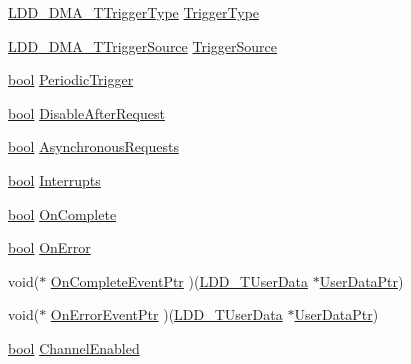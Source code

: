 \begin{DoxyCompactItemize}
\item 
\hyperlink{group___p_e___types__module_ga5590e47d6e7263ae9257e0d231c89521}{L\+D\+D\+\_\+\+D\+M\+A\+\_\+\+T\+Trigger\+Type} \hyperlink{struct_l_d_d___d_m_a___t_transfer_descriptor_a7ae73456c136555f37c61c84b801a3de}{Trigger\+Type}
\item 
\hyperlink{group___p_e___types__module_ga8af21cbad27c8d061a98924a11fc5a9b}{L\+D\+D\+\_\+\+D\+M\+A\+\_\+\+T\+Trigger\+Source} \hyperlink{struct_l_d_d___d_m_a___t_transfer_descriptor_a3d3f65eff6c5d9ed22879332bd23c7a6}{Trigger\+Source}
\item 
\hyperlink{group___p_e___types__module_ga97a80ca1602ebf2303258971a2c938e2}{bool} \hyperlink{struct_l_d_d___d_m_a___t_transfer_descriptor_a3e0a883d708eebc01cf07a24d45e53bb}{Periodic\+Trigger}
\item 
\hyperlink{group___p_e___types__module_ga97a80ca1602ebf2303258971a2c938e2}{bool} \hyperlink{struct_l_d_d___d_m_a___t_transfer_descriptor_a1f619ae63672eec01a264b129679f4e3}{Disable\+After\+Request}
\item 
\hyperlink{group___p_e___types__module_ga97a80ca1602ebf2303258971a2c938e2}{bool} \hyperlink{struct_l_d_d___d_m_a___t_transfer_descriptor_a6bc9757a48a8deb6639ae11dda2483bc}{Asynchronous\+Requests}
\item 
\hyperlink{group___p_e___types__module_ga97a80ca1602ebf2303258971a2c938e2}{bool} \hyperlink{struct_l_d_d___d_m_a___t_transfer_descriptor_a40f1b8b30d17a9f9bfa54a4a6c8acc57}{Interrupts}
\item 
\hyperlink{group___p_e___types__module_ga97a80ca1602ebf2303258971a2c938e2}{bool} \hyperlink{struct_l_d_d___d_m_a___t_transfer_descriptor_aa5f0f9c4b4184409be1a37ecfa110156}{On\+Complete}
\item 
\hyperlink{group___p_e___types__module_ga97a80ca1602ebf2303258971a2c938e2}{bool} \hyperlink{struct_l_d_d___d_m_a___t_transfer_descriptor_adaf3a82b2f9c667291b5b75015afd8d3}{On\+Error}
\item 
void($\ast$ \hyperlink{struct_l_d_d___d_m_a___t_transfer_descriptor_a80aa18ef41bc87c254728cf86f6b0ce3}{On\+Complete\+Event\+Ptr} )(\hyperlink{group___p_e___types__module_ga0b66a73f87238a782318aa0be7578e35}{L\+D\+D\+\_\+\+T\+User\+Data} $\ast$\hyperlink{struct_l_d_d___d_m_a___t_transfer_descriptor_a8e77b9d030b00c231823350a904e0f83}{User\+Data\+Ptr})
\item 
void($\ast$ \hyperlink{struct_l_d_d___d_m_a___t_transfer_descriptor_aa16634a2ed2be93715b4f13be512e7be}{On\+Error\+Event\+Ptr} )(\hyperlink{group___p_e___types__module_ga0b66a73f87238a782318aa0be7578e35}{L\+D\+D\+\_\+\+T\+User\+Data} $\ast$\hyperlink{struct_l_d_d___d_m_a___t_transfer_descriptor_a8e77b9d030b00c231823350a904e0f83}{User\+Data\+Ptr})
\item 
\hyperlink{group___p_e___types__module_ga97a80ca1602ebf2303258971a2c938e2}{bool} \hyperlink{struct_l_d_d___d_m_a___t_transfer_descriptor_a7f5ef4fceeb4716a609b808643c9785b}{Channel\+Enabled}
\end{DoxyCompactItemize}


